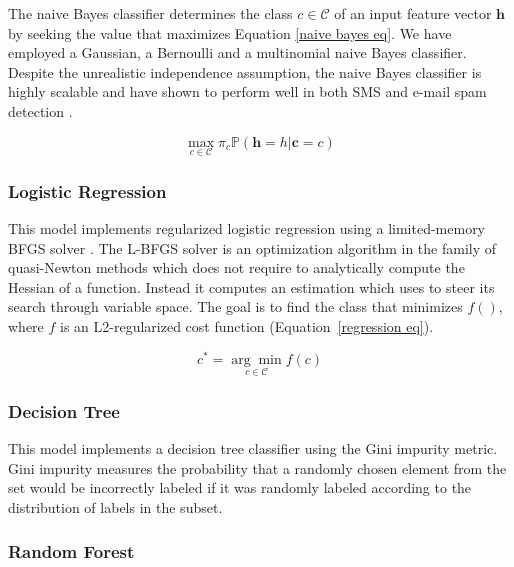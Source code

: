 \documentclass[letterpaper]{article}
\begin{document}
The naive Bayes classifier determines the class $c \in \mathcal{C}$ of an input feature vector $\mathbf{h}$ by seeking the value that maximizes Equation \ref{naive bayes eq}. We have employed a Gaussian, a Bernoulli and a multinomial naive Bayes classifier. Despite the unrealistic independence assumption, the naive Bayes classifier is highly scalable and have shown to perform well in both SMS and e-mail spam detection \cite{gomez2006content} \cite{androutsopoulos2000evaluation}.

\begin{equation} \label{naive bayes eq}
	\underset{c \in \mathcal{C}}{\max} \pi_c \mathds{P} (\mathbf{h} = h | \mathbf{c} = c)
\end{equation}

\subsubsection{Logistic Regression}  \label{Logistic Regression}

This model implements regularized logistic regression using a limited-memory BFGS solver \cite{liu1989limited}. The L-BFGS solver is an optimization algorithm in the family of quasi-Newton methods which does not require to analytically compute the Hessian of a function. Instead it computes an estimation which uses to steer its search through variable space. The goal is to find the class that minimizes $f()$, where $f$ is an L2-regularized cost function (Equation~\ref{regression eq}).

\begin{equation} \label{regression eq}
	c^* = \underset{c \in \mathcal{C}}{\arg \min} f(c) 
\end{equation}

\subsubsection{Decision Tree} \label{Decision Tree}

This model implements a decision tree classifier using the Gini impurity metric. Gini impurity measures the probability that a randomly chosen element from the set would be incorrectly labeled if it was randomly labeled according to the distribution of labels in the subset.

\subsubsection{Random Forest}  \label{Random Forest}
\end{document}
